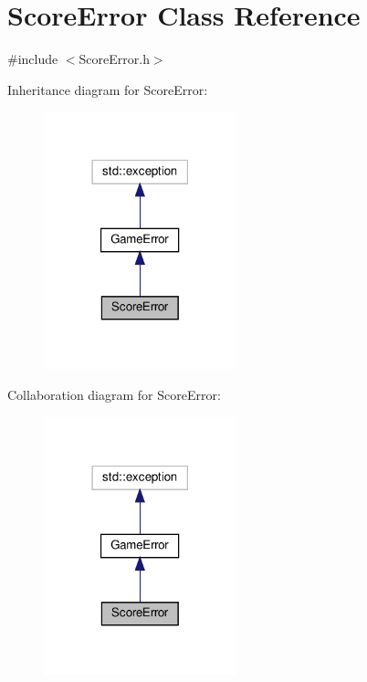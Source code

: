 \hypertarget{classScoreError}{}\section{Score\+Error Class Reference}
\label{classScoreError}


{\ttfamily \#include $<$Score\+Error.\+h$>$}



Inheritance diagram for Score\+Error\+:\nopagebreak
\begin{figure}[H]
\begin{center}
\leavevmode
\includegraphics[width=158pt]{classScoreError__inherit__graph}
\end{center}
\end{figure}


Collaboration diagram for Score\+Error\+:\nopagebreak
\begin{figure}[H]
\begin{center}
\leavevmode
\includegraphics[width=158pt]{classScoreError__coll__graph}
\end{center}
\end{figure}
